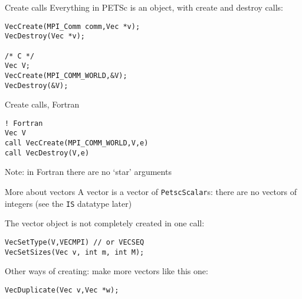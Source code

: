 
\lstset{language=C}


\begin{details}
\begin{numberedframe}{Create calls}
\small
Everything in PETSc is an object, with create and destroy calls:
\begin{lstlisting}
VecCreate(MPI_Comm comm,Vec *v);
VecDestroy(Vec *v);

/* C */
Vec V;
VecCreate(MPI_COMM_WORLD,&V);
VecDestroy(&V);
\end{lstlisting}
\end{numberedframe}

\lstset{language=Fortran}
\begin{fortran}
\begin{numberedframe}{Create calls, Fortran}
\begin{lstlisting}
! Fortran
Vec V
call VecCreate(MPI_COMM_WORLD,V,e)
call VecDestroy(V,e)
\end{lstlisting}
Note: in Fortran there are no `star' arguments
\end{numberedframe}
\end{fortran}
\lstset{language=C}

\begin{numberedframe}{More about vectors}
A vector is a vector of \lstinline{PetscScalar}s: there are no vectors of
integers (see the \lstinline{IS} datatype later)

The vector object is not completely created in one call:
\begin{lstlisting}
VecSetType(V,VECMPI) // or VECSEQ
VecSetSizes(Vec v, int m, int M);
\end{lstlisting}
Other ways of creating: make more vectors like this one:
\begin{lstlisting}
VecDuplicate(Vec v,Vec *w);
\end{lstlisting}
\end{numberedframe}

\end{details}

